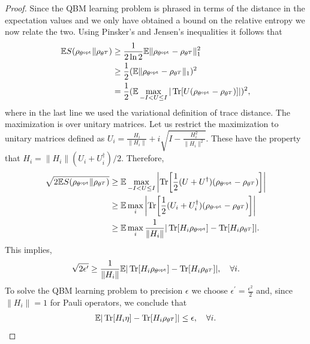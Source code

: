 \documentclass[
    aps,
    prx,
    onecolumn
]{revtex4-2}
\begin{document}
\begin{proof}
Since the QBM learning problem is phrased in terms of the distance in the expectation values and we only have obtained a bound on the relative entropy we now relate the two. Using Pinsker's and Jensen's inequalities it follows that
\begin{align}
    \mathbb{E} S(\rho_{\theta^\mathrm{opt}} \|\rho_{\theta^T}) &\geq \frac{1}{2 \ln 2} \mathbb{E} \| \rho_{\theta^\mathrm{opt}} - \rho_{\theta^T}  \|^2_1 \\
    &\geq \frac{1}{2} ( \mathbb{E} \| \rho_{\theta^\mathrm{opt}} - \rho_{\theta^T}  \|_1 )^2 \\
    &= \frac{1}{2} ( \mathbb{E} \max_{-I < U \leq I} | \Tr[ U (\rho_{\theta^\mathrm{opt}} - \rho_{\theta^T}) ] | )^2,
\end{align}
where in the last line we used the variational definition of trace distance. The maximization is over unitary matrices. Let us restrict the maximization to unitary matrices defined as $U_i = \frac{H_i}{\| H_i \|} + i \sqrt{ I - \frac{H_i^2}{\| H_i \|^2} }$. These have the property that $H_i = \| H_i \| (U_i + U_i^\dag )/2$. 
Therefore,
\begin{align}
\begin{split}
    \sqrt{2\mathbb{E} S(\rho_{\theta^\mathrm{opt}} \|\rho_{\theta^T})} &\geq \mathbb{E} \max_{-I < U \leq I} \left| \Tr[ \frac{1}{2}(U + U^\dag) (\rho_{\theta^\mathrm{opt}} - \rho_{\theta^T}) ] \right| \\
    &\geq \mathbb{E} \max_i \left| \Tr[ \frac{1}{2}(U_i + U_i^\dag)(\rho_{\theta^\mathrm{opt}} - \rho_{\theta^T}) ] \right| \\
    & \geq \mathbb{E} \max_i \frac{1}{\| H_i\|} | \Tr[ H_i \rho_{\theta^\mathrm{opt}}]  - \Tr[ H_i \rho_{\theta^T} ] | .
\end{split}
\end{align}
This implies,
\begin{align}
    \sqrt{2\epsilon^\prime} \geq \frac{1}{\| H_i \| } \mathbb{E} | \Tr[ H_i \rho_{\theta^\mathrm{opt}}]  - \Tr[ H_i \rho_{\theta^T} ] | , \quad \forall i . 
\end{align}
To solve the QBM learning problem to precision $\epsilon$ we choose $\epsilon^\prime = \frac{\epsilon^2}{2}$ and, since $\| H_i \| = 1$ for Pauli operators, we conclude that
\begin{align}
    \mathbb{E} | \Tr[ H_i \eta]  - \Tr[ H_i \rho_{\theta^T} ] | \leq \epsilon , \quad \forall i . 
\end{align}
\end{proof}
\end{document}
